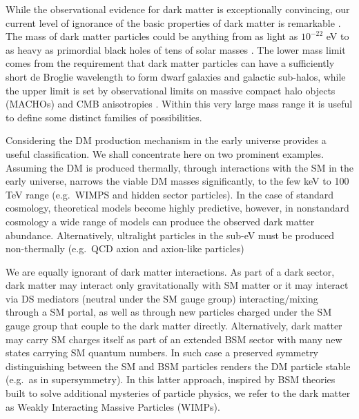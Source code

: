 While the observational evidence for dark matter is exceptionally convincing, our current level of ignorance of the basic properties of dark matter is remarkable 
\cite{Bertone:2016nfn}. The mass of dark matter particles could be anything from as light as $10^{-22}$ eV \cite{Hu:2000ke} to as heavy as primordial black holes of tens of solar masses \cite{Bird:2016dcv}. The lower mass limit comes from the requirement that dark matter particles can have a sufficiently short de Broglie wavelength to form dwarf galaxies and galactic sub-halos, while the upper limit is set by observational limits on massive compact halo objects (MACHOs) and CMB anisotropies \cite{Brandt:2016aco,Nakama:2017xvq,Ali-Haimoud:2016mbv}. Within this very large mass range it is useful to define some distinct families of possibilities. 

Considering the DM production mechanism in the early universe provides a useful classification. We shall concentrate  here on  two prominent examples. %
Assuming the DM is produced thermally, through interactions with the SM in the early universe, 
narrows the viable DM masses significantly, to the few keV to 100 TeV range (e.g.\ WIMPS and hidden sector particles). 
In the case of standard cosmology, theoretical models become highly predictive, however, in nonstandard cosmology a wide range of models can produce the observed dark 
matter abundance.
Alternatively, ultralight particles in the sub-eV must be produced non-thermally (e.g.\ QCD axion and axion-like particles) 

We are equally ignorant of dark matter interactions. As part of a dark sector, 
dark matter may interact only gravitationally with SM matter or it may interact via DS mediators (neutral under the SM gauge group) interacting/mixing through a SM portal, as well as through new particles charged under the SM gauge group that couple to the dark matter directly.
Alternatively, dark matter may carry SM charges itself as  part of an extended BSM sector with many new states carrying SM quantum numbers. In such case  a preserved  symmetry distinguishing between the SM and BSM particles  renders the DM particle stable (e.g.\ as in supersymmetry). 
In this latter approach, inspired by BSM theories built to solve additional mysteries of particle physics, we refer to the dark matter as Weakly Interacting Massive Particles (WIMPs).


